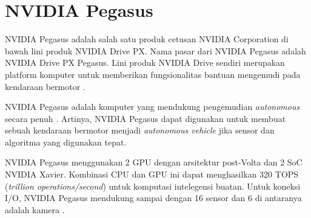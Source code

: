 \section{NVIDIA Pegasus}\label{chapter-2-section-pegasus}

NVIDIA Pegasus adalah salah satu produk cetusan NVIDIA Corporation di bawah lini
produk NVIDIA Drive PX. Nama pasar dari NVIDIA Pegasus adalah NVIDIA Drive
PX Pegasus. Lini produk NVIDIA Drive sendiri merupakan platform komputer untuk
memberikan fungsionalitas bantuan mengemudi pada kendaraan bermotor
\parencite{oh_2017}.


NVIDIA Pegasus adalah komputer yang mendukung pengemudian \textit{autonomous}
secara penuh \parencite{oh_2017}. Artinya, NVIDIA Pegasus dapat digunakan untuk
membuat sebuah kendaraan bermotor menjadi \textit{autonomous vehicle} jika
sensor dan algoritma yang digunakan tepat.

NVIDIA Pegasus menggunakan 2 GPU dengan arsitektur post-Volta dan 2 SoC NVIDIA
Xavier. Kombinasi CPU dan GPU ini dapat menghasilkan 320 TOPS (\textit{trillion
	operations/second}) untuk komputasi intelegensi buatan. Untuk koneksi I/O,
NVIDIA Pegasus mendukung sampai dengan 16 sensor dan 6 di antaranya adalah
kamera \parencite{oh_2017}.




